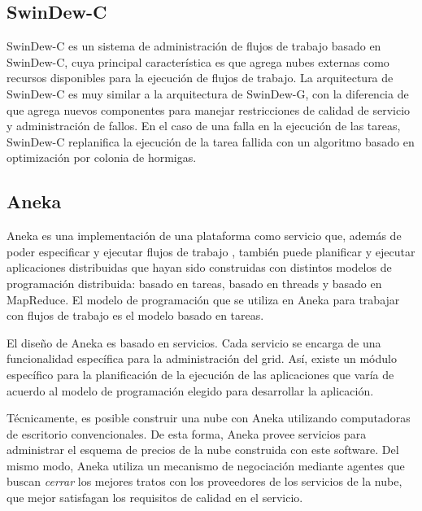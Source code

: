 \subsection{SwinDew-C}

SwinDew-C \cite{liu2010swindew} es un sistema de administración de flujos de trabajo basado en SwinDew-C, cuya principal característica es que agrega nubes externas como recursos disponibles para la ejecución de flujos de trabajo. La arquitectura de SwinDew-C es muy similar a la arquitectura de SwinDew-G, con la diferencia de que agrega nuevos componentes para manejar restricciones de calidad de servicio y administración de fallos. En el caso de una falla en la ejecución de las tareas, SwinDew-C replanifica la ejecución de la tarea fallida con un algoritmo basado en optimización por colonia de hormigas.

\subsection{Aneka}

Aneka \cite{chu2007aneka} es una implementación de una plataforma como servicio que, además de poder especificar y ejecutar flujos de trabajo , también puede planificar y ejecutar aplicaciones distribuidas que hayan sido construidas con distintos modelos de programación distribuida: basado en tareas, basado en threads y basado en MapReduce. El modelo de programación que se utiliza en Aneka para trabajar con flujos de trabajo es el modelo basado en tareas.

El diseño de Aneka es basado en servicios. Cada servicio se encarga de una funcionalidad específica para la administración del grid. Así, existe un módulo específico para la planificación de la ejecución de las aplicaciones que varía de acuerdo al modelo de programación elegido para desarrollar la aplicación.

Técnicamente, es posible construir una nube con Aneka \cite{vecchiola2009aneka} utilizando computadoras de escritorio convencionales. De esta forma, Aneka provee servicios para administrar el esquema de precios de la nube construida con este software. Del mismo modo, Aneka utiliza un mecanismo de negociación mediante agentes que buscan \emph{cerrar} los mejores tratos con los proveedores de los servicios de la nube, que mejor satisfagan los requisitos de calidad en el servicio.

